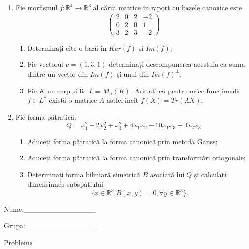 \documentclass{article}
\begin{document}
\begin{enumerate}
 \item Fie morfismul $f:\mathbb{R}^4 \to \mathbb{R}^3$ al cărui matrice în raport cu bazele canonice este
$$\begin{pmatrix}
2&0&2&-2\\
0&2&0&1\\
3&2&3&-2
\end{pmatrix}$$

\begin{enumerate}
\item Determinați cîte o bază în $Ker(f)$ și $Im(f)$;
\item Fie vectorul $v=(1,3,1)$ determinați descompunerea acestuia ca suma dintre un vector din $Im(f)$ și unul din $Im(f)^\perp$;
\item Fie $K$ un corp și fie $L=M_n(K)$. Arătați că pentru orice funcțională $f \in L^*$ există o matrice $A$ astfel încît $f(X)=Tr(AX)$;
\end{enumerate}
\item Fie forma pătratică:
$$Q= x_1^2-2x_2^2+x_3^2+4x_1x_2-10x_1x_3+4x_2x_3$$

\begin{enumerate}
\item Aduceți forma pătratică la forma canonică prin metoda Gauss;
\item Aduceți forma pătratică la forma canonică prin transformări ortogonale;
\item Determinați forma biliniară simetrică $B$ asociată lui $Q$ și calculați dimensiunea subspațiului
$$\{x \in \mathbb{R}^3 | B(x,y)=0,\forall y \in \mathbb{R}^3\}.$$

\end{enumerate}
\end{enumerate}
\newpage
\begin{flushright}
Nume:\_\_\_\_\_\_\_\_\_\_\_\_\_\_
 
 
Grupa:\_\_\_\_\_\_\_\_\_\_\_\_\_\_
\end{flushright}
\begin{center}
\vspace{2cm}
{\Large Probleme}
\vspace{2cm}
\end{center}
\end{document}

